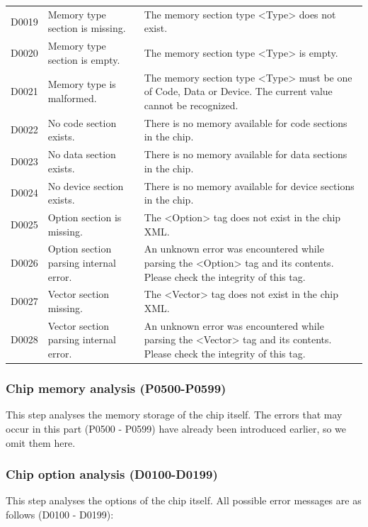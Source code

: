 \begin{xltabular}{\textwidth}{@{}>{\hsize\raggedright\arraybackslash}X>{\hsize\raggedright\arraybackslash}X>{\hsize\raggedright\arraybackslash}X@{}}
D0019 & Memory type section is missing. &
The memory section type <Type> does not exist.\tabularnewline
D0020 & Memory type section is empty. &
The memory section type <Type> is empty.\tabularnewline
D0021 & Memory type is malformed. &
The memory section type <Type> must be one of Code, Data or Device. The current value cannot be recognized.\tabularnewline
D0022 & No code section exists. &
There is no memory available for code sections in the chip.\tabularnewline
D0023 & No data section exists. &
There is no memory available for data sections in the chip.\tabularnewline
D0024 & No device section exists. &
There is no memory available for device sections in the chip.\tabularnewline
D0025 & Option section is missing. &
The <Option> tag does not exist in the chip XML.\tabularnewline
D0026 & Option section parsing internal error. &
An unknown error was encountered while parsing the <Option> tag and its contents. Please check the integrity of this tag.\tabularnewline
D0027 & Vector section missing. &
The <Vector> tag does not exist in the chip XML.\tabularnewline
D0028 & Vector section parsing internal error. &
An unknown error was encountered while parsing the <Vector> tag and its contents. Please check the integrity of this tag.\tabularnewline
\end{xltabular}

\subsubsection{Chip memory analysis (P0500-P0599)}\label{subsubsec:5-6-3-2}

This step analyses the memory storage of the chip itself. The errors that may occur in this part (P0500 -\/
P0599) have already been introduced earlier, so we omit them here.

\subsubsection{Chip option analysis (D0100-D0199)}\label{subsubsec:5-6-3-3}

This step analyses the options of the chip itself. All possible error messages are as follows (D0100 -\/
D0199):

